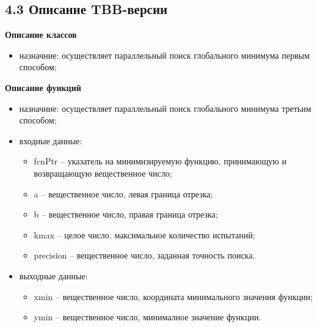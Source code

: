 \documentclass{report}
\begin{document}
\subsection*{4.3 Описание TBB-версии}
\textbf{Описание классов}
\begin{itemize}
\begin{lstlisting}
class Segment_split
{
    double (*fcnPtr)(double);
    int kmax;
    double precision;
    double xmin, ymin;
public:
    explicit Segment_split(double (*_fcnPtr)(double), int _kmax, double _precision);
    Segment_split(const Segment_split& tmp, split);
    void operator()(const blocked_range<double>& r);
    void join(const Segment_split& tmp);
    void result(double& _xmin, double& _ymin);
};
\end{lstlisting}
  \item назначние: осуществляет параллельный поиск глобального минимума первым способом;
\end{itemize} 
\textbf{Описание функций}
\begin{itemize}
\begin{lstlisting}
void parallel_global_search(double (*fcnPtr)(double), double a, double b, int kmax, double precision, double& xmin, double& ymin)
\end{lstlisting}
  \item назначние: осуществляет параллельный поиск глобального минимума третьим способом;
  \item входные данные:
  \begin{itemize}	
    \item fcnPtr – указатель на минимизируемую функцию, принимающую и возвращающую вещественное число;
    \item a – вещественное число, левая граница отрезка;
	\item b – вещественное число, правая граница отрезка;
    \item kmax – целое число, максимальное количество испытаний;
	\item precision – вещественное число, заданная точность поиска.
  \end{itemize}
  \item выходные данные:
  \begin{itemize}
	\item xmin – вещественное число, координата минимального значения функции;
	\item ymin – вещественное число, минималное значение функции.
  \end{itemize}
\end{itemize}
\newpage
\end{document}
